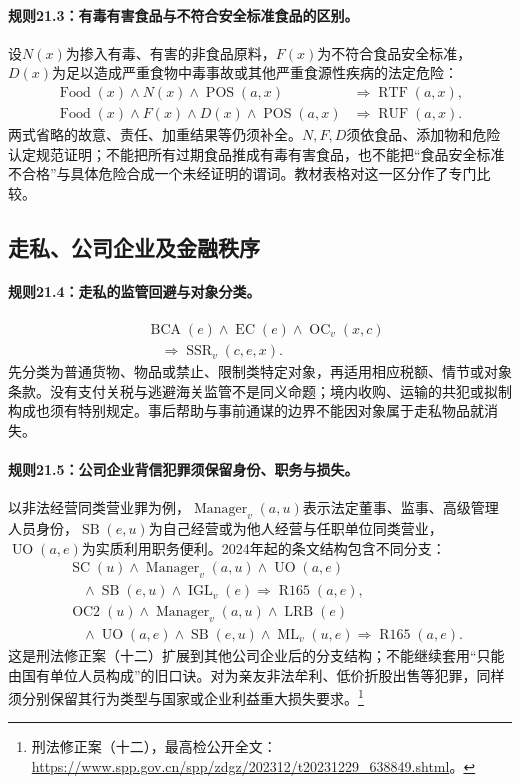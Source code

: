 \paragraph{规则21.3：有毒有害食品与不符合安全标准食品的区别。}
设$N(x)$为掺入有毒、有害的非食品原料，$F(x)$为不符合食品安全标准，$D(x)$为足以造成严重食物中毒事故或其他严重食源性疾病的法定危险：
\[
\begin{aligned}
\operatorname{Food}(x)\land N(x)\land\operatorname{POS}(a,x)
&\Rightarrow\operatorname{RTF}(a,x),\\
\operatorname{Food}(x)\land F(x)\land D(x)
\land\operatorname{POS}(a,x)
&\Rightarrow\operatorname{RUF}(a,x).
\end{aligned}
\]
两式省略的故意、责任、加重结果等仍须补全。$N,F,D$须依食品、添加物和危险认定规范证明；不能把所有过期食品推成有毒有害食品，也不能把“食品安全标准不合格”与具体危险合成一个未经证明的谓词。教材表格对这一区分作了专门比较。

\subsection{走私、公司企业及金融秩序}
\paragraph{规则21.4：走私的监管回避与对象分类。}
\[
\begin{aligned}
&\operatorname{BCA}(e)\land\operatorname{EC}(e)
\land\operatorname{OC}_v(x,c)\\
&\quad\Rightarrow\operatorname{SSR}_v(c,e,x).
\end{aligned}
\]
先分类为普通货物、物品或禁止、限制类特定对象，再适用相应税额、情节或对象条款。没有支付关税与逃避海关监管不是同义命题；境内收购、运输的共犯或拟制构成也须有特别规定。事后帮助与事前通谋的边界不能因对象属于走私物品就消失。

\paragraph{规则21.5：公司企业背信犯罪须保留身份、职务与损失。}
以非法经营同类营业罪为例，$\operatorname{Manager}_v(a,u)$表示法定董事、监事、高级管理人员身份，$\operatorname{SB}(e,u)$为自己经营或为他人经营与任职单位同类营业，$\operatorname{UO}(a,e)$为实质利用职务便利。2024年起的条文结构包含不同分支：
\[
\begin{aligned}
&\operatorname{SC}(u)\land\operatorname{Manager}_v(a,u)
\land\operatorname{UO}(a,e)\\
&\quad\land\operatorname{SB}(e,u)
\land\operatorname{IGL}_v(e)
\Rightarrow\operatorname{R165}(a,e),\\
&\operatorname{OC2}(u)\land\operatorname{Manager}_v(a,u)
\land\operatorname{LRB}(e)\\
&\quad\land\operatorname{UO}(a,e)\land\operatorname{SB}(e,u)
\land\operatorname{ML}_v(u,e)
\Rightarrow\operatorname{R165}(a,e).
\end{aligned}
\]
这是刑法修正案（十二）扩展到其他公司企业后的分支结构；不能继续套用“只能由国有单位人员构成”的旧口诀。对为亲友非法牟利、低价折股出售等犯罪，同样须分别保留其行为类型与国家或企业利益重大损失要求。\footnote{刑法修正案（十二），最高检公开全文：\url{https://www.spp.gov.cn/spp/zdgz/202312/t20231229_638849.shtml}。}

